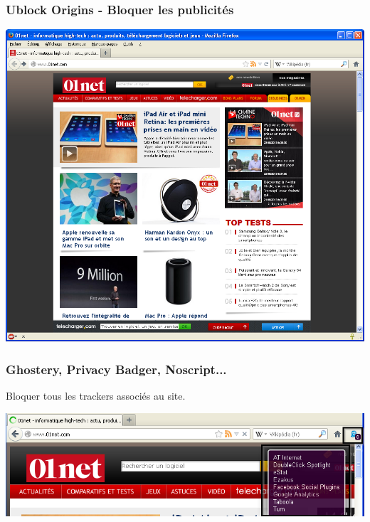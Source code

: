 \documentclass{beamer}
\begin{document}
\begin{frame}
\frametitle{Ublock Origins - Bloquer les publicités}
\begin{center}
\includegraphics[scale=0.4] {./images/Adblock02.png}
\end{center}
\end{frame}

\begin{frame}
\frametitle{Ghostery, Privacy Badger, Noscript...}
Bloquer tous les trackers associés au site.
\begin{center}
\includegraphics[scale=0.4] {./images/Ghostery_tracker.png}
\end{center}
\end{frame}
\end{document}
